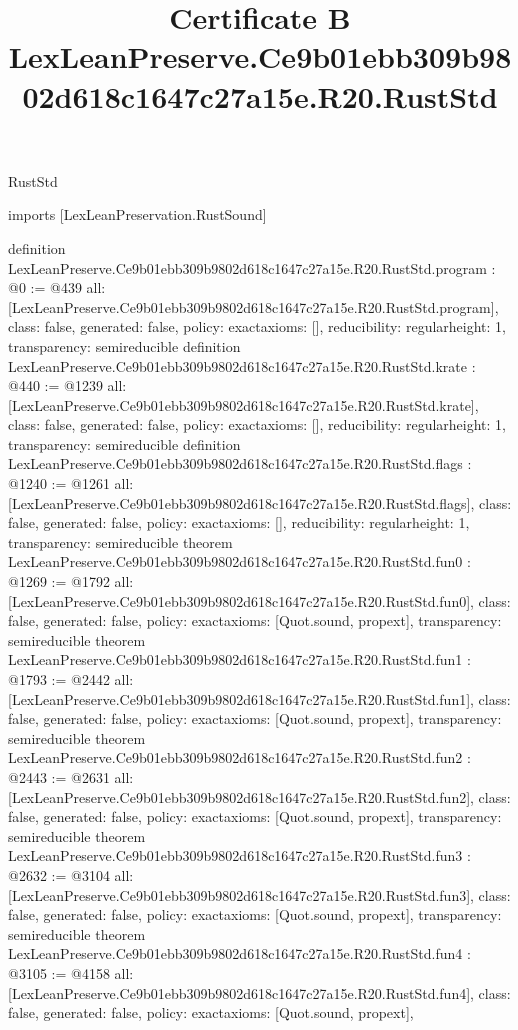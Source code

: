 \begin{lexlean}{RustStd}
\title{Certificate B LexLeanPreserve.Ce9b01ebb309b9802d618c1647c27a15e.R20.RustStd}
\begin{coremodule}
imports [LexLeanPreservation.RustSound]

definition LexLeanPreserve.Ce9b01ebb309b9802d618c1647c27a15e.R20.RustStd.program : @0 := @439 {
  all: [LexLeanPreserve.Ce9b01ebb309b9802d618c1647c27a15e.R20.RustStd.program],
  class: false,
  generated: false,
  policy: exact{axioms: []},
  reducibility: regular{height: 1},
  transparency: semireducible
}
definition LexLeanPreserve.Ce9b01ebb309b9802d618c1647c27a15e.R20.RustStd.krate : @440 := @1239 {
  all: [LexLeanPreserve.Ce9b01ebb309b9802d618c1647c27a15e.R20.RustStd.krate],
  class: false,
  generated: false,
  policy: exact{axioms: []},
  reducibility: regular{height: 1},
  transparency: semireducible
}
definition LexLeanPreserve.Ce9b01ebb309b9802d618c1647c27a15e.R20.RustStd.flags : @1240 := @1261 {
  all: [LexLeanPreserve.Ce9b01ebb309b9802d618c1647c27a15e.R20.RustStd.flags],
  class: false,
  generated: false,
  policy: exact{axioms: []},
  reducibility: regular{height: 1},
  transparency: semireducible
}
theorem LexLeanPreserve.Ce9b01ebb309b9802d618c1647c27a15e.R20.RustStd.fun0 : @1269 := @1792 {
  all: [LexLeanPreserve.Ce9b01ebb309b9802d618c1647c27a15e.R20.RustStd.fun0],
  class: false,
  generated: false,
  policy: exact{axioms: [Quot.sound, propext]},
  transparency: semireducible
}
theorem LexLeanPreserve.Ce9b01ebb309b9802d618c1647c27a15e.R20.RustStd.fun1 : @1793 := @2442 {
  all: [LexLeanPreserve.Ce9b01ebb309b9802d618c1647c27a15e.R20.RustStd.fun1],
  class: false,
  generated: false,
  policy: exact{axioms: [Quot.sound, propext]},
  transparency: semireducible
}
theorem LexLeanPreserve.Ce9b01ebb309b9802d618c1647c27a15e.R20.RustStd.fun2 : @2443 := @2631 {
  all: [LexLeanPreserve.Ce9b01ebb309b9802d618c1647c27a15e.R20.RustStd.fun2],
  class: false,
  generated: false,
  policy: exact{axioms: [Quot.sound, propext]},
  transparency: semireducible
}
theorem LexLeanPreserve.Ce9b01ebb309b9802d618c1647c27a15e.R20.RustStd.fun3 : @2632 := @3104 {
  all: [LexLeanPreserve.Ce9b01ebb309b9802d618c1647c27a15e.R20.RustStd.fun3],
  class: false,
  generated: false,
  policy: exact{axioms: [Quot.sound, propext]},
  transparency: semireducible
}
theorem LexLeanPreserve.Ce9b01ebb309b9802d618c1647c27a15e.R20.RustStd.fun4 : @3105 := @4158 {
  all: [LexLeanPreserve.Ce9b01ebb309b9802d618c1647c27a15e.R20.RustStd.fun4],
  class: false,
  generated: false,
  policy: exact{axioms: [Quot.sound, propext]},
}
\end{coremodule}
\end{lexlean}
